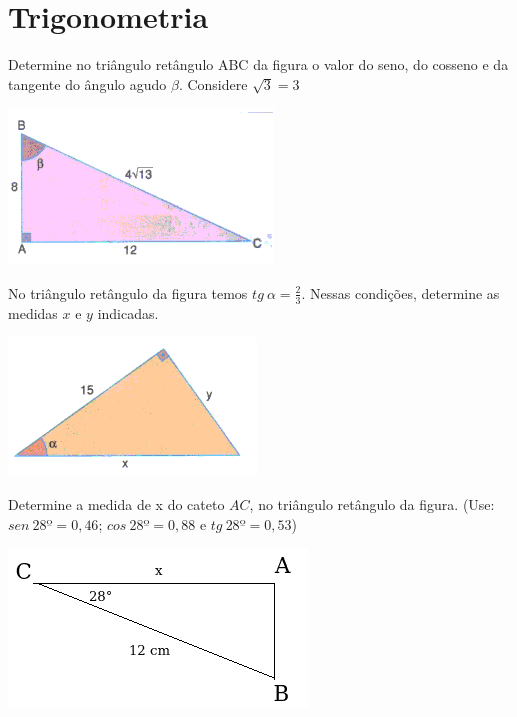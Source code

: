 \chapter{Trigonometria}

\item Determine no triângulo retângulo ABC da figura o valor do seno, do cosseno e da tangente do ângulo agudo $\beta$. Considere $\sqrt{3}=3$
\begin{center}
\includegraphics[scale=0.8]{figuras/fig84.png}
\end{center}

\item No triângulo retângulo da figura temos $tg\ \alpha=\displaystyle\frac{2}{3}$. Nessas condições, determine as medidas $x$ e $y$ indicadas.
\begin{center}
\includegraphics[scale=0.8]{figuras/fig85.png}
\end{center}

\item Determine a medida de x do cateto $AC$, no triângulo retângulo da figura. (Use: $sen\ 28º 
= 0,46$; $cos\ 28º = 0,88$ e $tg\ 28º = 0,53$)
\begin{center}
\includegraphics[scale=0.8]{figuras/fig86.png}
\end{center}


